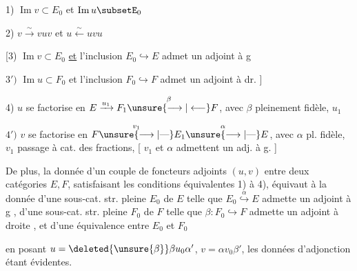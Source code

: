 1) $\operatorname{Im}v\subset E_0$ et  $\operatorname{Im}u\subsetE_0$

2) $v\xrightarrow{\sim}vuv$ et  $u\xleftarrow{\sim}uvu$

[3)  $\operatorname{Im}v\subset E_0$ \uline{et} l'inclusion $E_0\hookrightarrow E$ admet un adjoint à g

$3')$ $\operatorname{Im}u\subset F_0$ et l'inclusion $F_0\hookrightarrow F$ admet un adjoint à dr. ]


4) $u$ se factorise en $E\xrightarrow{u_1}F_1\overset{\beta}{\unsure{\longrightarrow|\longleftarrow}}F$, avec $\beta$ pleinement fidèle, $u_1$ 

$4')$ $v$ se factorise en $F\overset{v_1}{\unsure{\longrightarrow|\text{---}}} E_1\overset{\alpha}{\unsure{\longrightarrow|\text{---}}}E$, avec $\alpha$ pl. fidèle, $v_1$ passage à cat. des fractions, [ $v_1$ et $\alpha$ admettent un adj. à g. ]

De  plus, la donnée d'un couple de foncteurs adjoints $(u,v)$ entre deux catégories $E,F$, satisfaisant les conditions équivalentes 1) à 4), équivaut à la donnée d'une sous-cat. str. pleine $E_0$ de $E$ telle que $E_0\overset{\alpha}{\hookrightarrow}E$ admette un adjoint à g , d'une sous-cat. str. pleine $F_0$ de $F$ telle que $\beta:F_0\hookrightarrow F$ admette un adjoint à droite , et d'une équivalence entre $E_0$ et $F_0$


en posant $u=\deleted{\unsure{\beta}}\beta u_0\alpha'$, $v=\alpha v_0\beta'$, les données d'adjonction étant évidentes.




